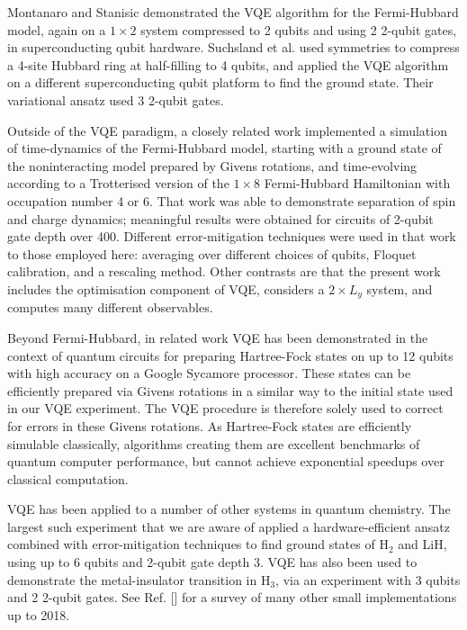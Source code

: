 \documentclass[aps,prb,twoside,superscriptaddress,longbibliography,nofootinbib,floatfix, notitlepage,twocolumn]{revtex4-1}
\begin{document}
Montanaro and Stanisic\cite{montanaro20} demonstrated the VQE algorithm for the Fermi-Hubbard model, again on a $1\times 2$ system compressed to 2 qubits and using 2 2-qubit gates, in superconducting qubit hardware. Suchsland et al.\cite{suchsland21} used symmetries to compress a 4-site Hubbard ring at half-filling to 4 qubits, and applied the VQE algorithm on a different superconducting qubit platform to find the ground state. Their variational ansatz used 3 2-qubit gates.

Outside of the VQE paradigm, a closely related work implemented a simulation of time-dynamics of the Fermi-Hubbard model\cite{GoogleFH_TDS_2020}, starting with a ground state of the noninteracting model prepared by Givens rotations, and time-evolving according to a Trotterised version of the $1\times 8$ Fermi-Hubbard Hamiltonian with occupation number 4 or 6. That work was able to demonstrate separation of spin and charge dynamics; meaningful results were obtained for circuits of 2-qubit gate depth over 400. Different error-mitigation techniques were used in that work to those employed here: averaging over different choices of qubits, Floquet calibration, and a rescaling method. Other contrasts are that the present work includes the optimisation component of VQE, considers a $2\times L_y$ system, and computes many different observables.

Beyond Fermi-Hubbard, in related work VQE has been demonstrated in the context of quantum circuits for preparing Hartree-Fock states on up to 12 qubits with high accuracy on a Google Sycamore processor\cite{GoogleVQE_2020}. These states can be efficiently prepared via Givens rotations in a similar way to the initial state used in our VQE experiment. The VQE procedure is therefore solely used to correct for errors in these Givens rotations. As Hartree-Fock states are efficiently simulable classically, algorithms creating them are excellent benchmarks of quantum computer performance, but cannot achieve exponential speedups over classical computation.

VQE has been applied to a number of other systems in quantum chemistry. The largest such experiment that we are aware of applied a hardware-efficient ansatz combined with error-mitigation techniques to find ground states of H$_2$ and LiH, using up to 6 qubits and 2-qubit gate depth 3\cite{kandala19}. VQE has also been used to demonstrate the metal-insulator transition in H$_3$, via an experiment with 3 qubits and 2 2-qubit gates\cite{smart19}. See Ref. [] for a survey of many other small implementations up to 2018.
\end{document}
